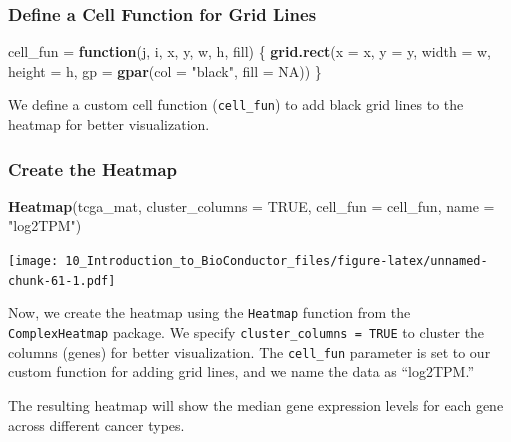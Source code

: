 \documentclass[
]{book}
\newenvironment{Shaded}{\begin{snugshade}}{\end{snugshade}}
\newcommand{\AttributeTok}[1]{\textcolor[rgb]{0.13,0.29,0.53}{#1}}
\newcommand{\ConstantTok}[1]{\textcolor[rgb]{0.56,0.35,0.01}{#1}}
\newcommand{\ControlFlowTok}[1]{\textcolor[rgb]{0.13,0.29,0.53}{\textbf{#1}}}
\newcommand{\FunctionTok}[1]{\textcolor[rgb]{0.13,0.29,0.53}{\textbf{#1}}}
\newcommand{\NormalTok}[1]{#1}
\newcommand{\OtherTok}[1]{\textcolor[rgb]{0.56,0.35,0.01}{#1}}
\newcommand{\StringTok}[1]{\textcolor[rgb]{0.31,0.60,0.02}{#1}}
\begin{document}
\hypertarget{define-a-cell-function-for-grid-lines}{%
\subsubsection{Define a Cell Function for Grid Lines}\label{define-a-cell-function-for-grid-lines}}

\begin{Shaded}
\begin{Highlighting}[]
\NormalTok{cell\_fun }\OtherTok{=} \ControlFlowTok{function}\NormalTok{(j, i, x, y, w, h, fill) \{}
  \FunctionTok{grid.rect}\NormalTok{(}\AttributeTok{x =}\NormalTok{ x, }\AttributeTok{y =}\NormalTok{ y, }\AttributeTok{width =}\NormalTok{ w, }\AttributeTok{height =}\NormalTok{ h, }\AttributeTok{gp =} \FunctionTok{gpar}\NormalTok{(}\AttributeTok{col =} \StringTok{"black"}\NormalTok{, }\AttributeTok{fill =} \ConstantTok{NA}\NormalTok{))}
\NormalTok{\}}
\end{Highlighting}
\end{Shaded}

We define a custom cell function (\texttt{cell\_fun}) to add black grid lines to the heatmap for better visualization.

\hypertarget{create-the-heatmap}{%
\subsubsection{Create the Heatmap}\label{create-the-heatmap}}

\begin{Shaded}
\begin{Highlighting}[]
\FunctionTok{Heatmap}\NormalTok{(tcga\_mat, }\AttributeTok{cluster\_columns =} \ConstantTok{TRUE}\NormalTok{, }\AttributeTok{cell\_fun =}\NormalTok{ cell\_fun, }\AttributeTok{name =} \StringTok{"log2TPM"}\NormalTok{)}
\end{Highlighting}
\end{Shaded}

\texttt{[image: 10\_Introduction\_to\_BioConductor\_files/figure-latex/unnamed-chunk-61-1.pdf]}

Now, we create the heatmap using the \texttt{Heatmap} function from the \texttt{ComplexHeatmap} package. We specify \texttt{cluster\_columns\ =\ TRUE} to cluster the columns (genes) for better visualization. The \texttt{cell\_fun} parameter is set to our custom function for adding grid lines, and we name the data as ``log2TPM.''

The resulting heatmap will show the median gene expression levels for each gene across different cancer types.
\end{document}
